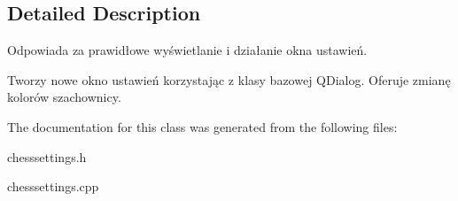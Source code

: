 \subsection{Detailed Description}
Odpowiada za prawidłowe wyświetlanie i działanie okna ustawień. 

Tworzy nowe okno ustawień korzystając z klasy bazowej Q\+Dialog. Oferuje zmianę kolorów szachownicy. 

The documentation for this class was generated from the following files\+:\begin{DoxyCompactItemize}
\item 
chesssettings.\+h\item 
chesssettings.\+cpp\end{DoxyCompactItemize}
